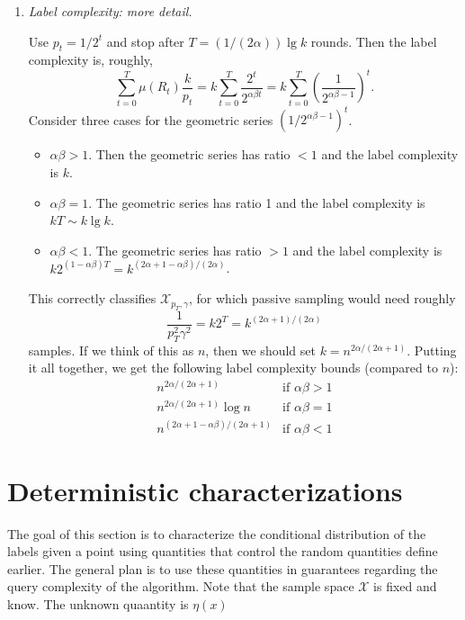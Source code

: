 \documentclass{article}
\def\X{{\mathcal X}}
\begin{document}
\begin{enumerate}
\item {\it Label complexity: more detail.}

Use $p_t = 1/2^t$ and stop after $T = (1/(2 \alpha)) \lg k$ rounds. Then the label complexity is, roughly,
$$ \sum_{t=0}^T \mu(R_t) \frac{k}{p_t} = k \sum_{t=0}^T \frac{2^t}{2^{\alpha\beta t}} = k \sum_{t = 0}^T \left( \frac{1}{2^{\alpha\beta - 1}}\right)^t .$$
Consider three cases for the geometric series $(1/2^{\alpha\beta - 1})^t$.
\begin{itemize}
\item $\alpha \beta > 1$. Then the geometric series has ratio $< 1$ and the label complexity is $k$.
\item $\alpha \beta = 1$. The geometric series has ratio 1 and the label complexity is $k T \sim k \lg k$.
\item $\alpha \beta < 1$. The geometric series has ratio $> 1$ and the label complexity is $k 2^{(1-\alpha\beta)T} = k^{(2\alpha + 1 - \alpha\beta)/(2 \alpha)}$.
\end{itemize}
This correctly classifies $\X_{p_T, \gamma}$, for which passive sampling would need roughly 
$$ \frac{1}{p_T^2 \gamma^2} = k2^T = k^{(2\alpha + 1)/(2 \alpha)}$$
samples. If we think of this as $n$, then we should set $k = n^{2\alpha/(2\alpha+1)}$.
Putting it all together, we get the following label complexity bounds (compared to $n$):
$$ 
\begin{array}{ll}
n^{2\alpha/(2\alpha+1)} & \mbox{if $\alpha \beta > 1$} \\
n^{2\alpha/(2\alpha+1)} \log n & \mbox{if $\alpha \beta = 1$} \\
n^{(2\alpha + 1 - \alpha\beta)/(2\alpha+1)} & \mbox{if $\alpha \beta < 1$}
\end{array}
$$

\end{enumerate}

\section{Deterministic characterizations}

The goal of this section is to characterize the conditional distribution of the labels given a point using quantities that control the random quantities define earlier. The general plan is to use these quantities in guarantees regarding the query complexity of the algorithm. Note that the sample space $\X$ is fixed and know. The unknown quaantity is $\eta(x)$
\end{document}
